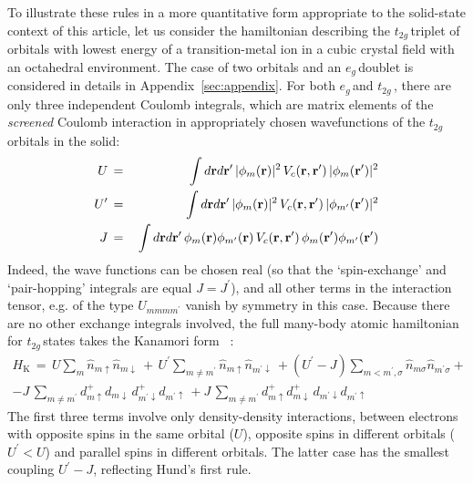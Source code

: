 \documentclass[]{ar2e-changed}%
\def\ed{\varepsilon_d}
\def\Up{U^\prime}
\def\hn{\hat{n}}
\def\hnmu{\hat{n}_{m\uparrow}}
\def\hnmd{\hat{n}_{m\downarrow}}
\def\hnpmd{\hat{n}_{m^\prime\downarrow}}
\def\spinup{\uparrow}
\def\spindown{\downarrow}
\def\vr{{\bf r}}
\def\vrp{{\bf r}^\prime}
\def\mp{m^\prime}
\def\ttg{$t_{2g}\,$}
\def\eg{$e_{g}\,$}
\begin{document}
To illustrate these rules in a more quantitative form appropriate to the solid-state context of this article, 
let us consider the hamiltonian describing 
the \ttg triplet of orbitals with lowest energy of a transition-metal ion in a cubic crystal field with an octahedral environment. 
%
The case of two orbitals and an \eg doublet is considered in details in Appendix~\ref{sec:appendix}. 
%
For both \eg and \ttg, there are only three independent Coulomb integrals, which are matrix elements of the {\it screened} Coulomb interaction 
in appropriately chosen wavefunctions of the \ttg orbitals in the solid:
%
\begin{eqnarray}
U\,&=&\, \int d\vr d\vrp\, |\phi_m(\vr)|^2\, V_c(\vr,\vrp)\, |\phi_m(\vrp)|^2 
\nonumber \\
U^\prime\,&=&\, \int d\vr d\vrp\, |\phi_m(\vr)|^2\, V_c(\vr,\vrp)\, |\phi_{\mp}(\vrp)|^2 
\nonumber \\
J\,&=&\, \int d\vr d\vrp\, \phi_m(\vr)\phi_{\mp}(\vr)\, V_c(\vr,\vrp)\, \phi_m(\vrp)\phi_{\mp}(\vrp) 
\label{eq:uupj}
\end{eqnarray}
Indeed, the wave functions can be chosen real (so that the `spin-exchange' and 
`pair-hopping' integrals are equal $J=J^\prime$),  
and all other terms in the interaction tensor, e.g. of the type $U_{mmm\mp}$ vanish by symmetry in this case. 
%
Because there are no other exchange integrals involved, the full many-body atomic hamiltonian for 
\ttg states takes the Kanamori form~\cite{kanamori_ptp_1963} :
\begin{eqnarray}
H_{\mathrm{K}}\,=\,U\sum_m \hnmu\hnmd\,+\,U^\prime\sum_{m\neq\mp} \hnmu\hnpmd\,
+(U^\prime-J) \sum_{m<\mp,\sigma} \hn_{m\sigma}\hn_{\mp\sigma} + \nonumber \\
-J\,\sum_{m\neq\mp} d^+_{m\spinup}d_{m\spindown}\,d^+_{\mp\spindown}d_{\mp\spinup} \,
+ J\, \sum_{m\neq\mp} d^+_{m\spinup}d^+_{m\spindown}\,d_{\mp\spindown}d_{\mp\spinup} 
\label{eq:ham_kanamori} 
\end{eqnarray}
The first three terms involve only density-density interactions, between electrons with opposite spins in the 
same orbital ($U$), opposite spins in different orbitals ($\Up<U$) and parallel spins in different orbitals. The latter case 
has the smallest coupling $\Up-J$, reflecting Hund's first rule. 
%
\end{document}
